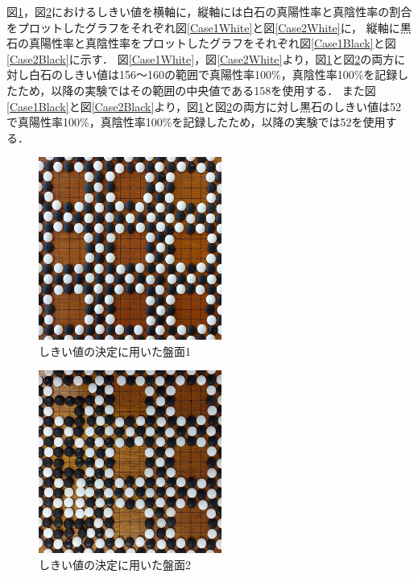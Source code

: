 \documentclass[openright]{nitocs}
\numberwithin{equation}{section}
\begin{document}
            図\ref{DSC0087}，図\ref{DSC0100}におけるしきい値を横軸に，縦軸には白石の真陽性率と真陰性率の割合をプロットしたグラフをそれぞれ図\ref{Case1White}と図\ref{Case2White}に，
            縦軸に黒石の真陽性率と真陰性率をプロットしたグラフをそれぞれ図\ref{Case1Black}と図\ref{Case2Black}に示す．
            図\ref{Case1White}，図\ref{Case2White}より，図\ref{DSC0087}と図\ref{DSC0100}の両方に対し白石のしきい値は156～160の範囲で真陽性率100\%，真陰性率100\%を記録したため，以降の実験ではその範囲の中央値である158を使用する．
            また図\ref{Case1Black}と図\ref{Case2Black}より，図\ref{DSC0087}と図\ref{DSC0100}の両方に対し黒石のしきい値は52で真陽性率100\%，真陰性率100\%を記録したため，以降の実験では52を使用する．

            \begin{figure}[tb] %
                \begin{center}
                \includegraphics[clip,width=60mm]{DSC_0087/boardImg.jpg} 
                \caption{しきい値の決定に用いた盤面1}
                \label{DSC0087}
                \end{center}
            \end{figure}

            \begin{figure}[tb] %
                \begin{center}
                \includegraphics[clip,width=60mm]{DSC_0100/boardImg.jpg} 
                \caption{しきい値の決定に用いた盤面2}
                \label{DSC0100}
                \end{center}
            \end{figure}
\end{document}

